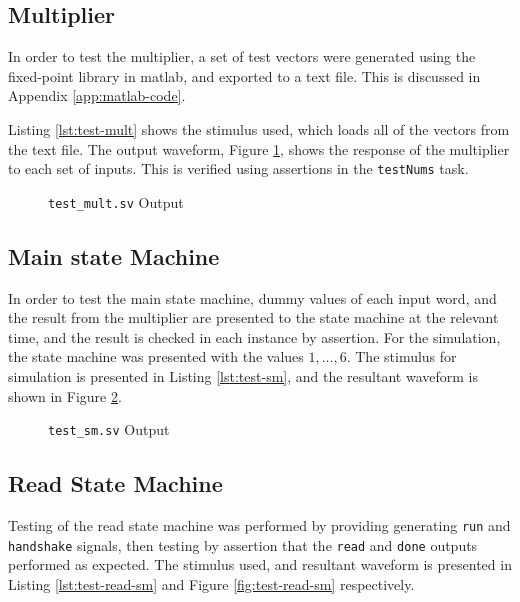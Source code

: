 \FloatBarrier
\subsection{Multiplier} \label{sec:test-mult}
In order to test the multiplier, a set of test vectors were generated using the fixed-point library in \gls{matlab}, and exported to a text file. This is discussed in Appendix \ref{app:matlab-code}.

Listing \ref{lst:test-mult} shows the stimulus used, which loads all of the vectors from the text file. The output waveform, Figure \ref{fig:test-mult}, shows the response of the multiplier to each set of inputs. This is verified using assertions in the \texttt{testNums} task.


\begin{figure}[ht]
	\centering
	
	\caption{\texttt{test\_mult.sv} Output}
	\label{fig:test-mult}
\end{figure}

\FloatBarrier
\subsection{Main state Machine}
In order to test the main state machine, dummy values of each input word, and the result from the multiplier are presented to the state machine at the relevant time, and the result is checked in each instance by assertion. For the simulation, the state machine was presented with the values $1,\dots,6$. The stimulus for simulation is presented in Listing \ref{lst:test-sm}, and the resultant waveform is shown in Figure \ref{fig:test-sm}.


\begin{figure}[ht]
	\centering
	
	\caption{\texttt{test\_sm.sv} Output}
	\label{fig:test-sm}
\end{figure}

\FloatBarrier
\subsection{Read State Machine}
Testing of the read state machine was performed by providing generating \texttt{run} and \texttt{handshake} signals, then testing by assertion that the \texttt{read} and \texttt{done} outputs performed as expected. The stimulus used, and resultant waveform is presented in Listing \ref{lst:test-read-sm} and Figure \ref{fig:test-read-sm} respectively.


